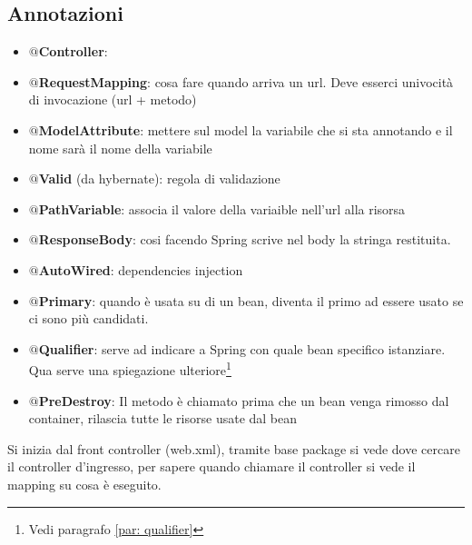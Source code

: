 \documentclass[11pt,a4paper]{book}
\begin{document}
\subsection{Annotazioni}
\begin{itemize}
	\item \textbf{$@$Controller}:
	\item \textbf{$@$RequestMapping}: cosa fare quando arriva un url. Deve esserci univocità di invocazione (url + metodo)
	\item \textbf{$@$ModelAttribute}: mettere sul model la variabile che si sta annotando e il nome sarà il nome della variabile
	\item \textbf{$@$Valid} (da hybernate): regola di validazione
	\item \textbf{$@$PathVariable}: associa il valore della variaible nell'url alla risorsa
	\item \textbf{$@$ResponseBody}: cosi facendo Spring scrive nel body la stringa restituita.
	\item \textbf{$@$AutoWired}: dependencies injection
	\item \textbf{$@$Primary}: quando è usata su di un bean, diventa il primo ad essere usato se ci sono più candidati.
	\item \textbf{$@$Qualifier}: serve ad indicare a Spring con quale bean specifico istanziare. Qua serve una spiegazione ulteriore\footnote{Vedi paragrafo \ref{par: qualifier}}
	\item \textbf{$@$PreDestroy}: Il metodo è chiamato prima che un bean venga rimosso dal container, rilascia tutte le risorse usate dal bean
\end{itemize}

Si inizia dal front controller (web.xml), tramite base package si vede dove cercare il controller d'ingresso, per sapere quando chiamare il controller si vede il mapping su cosa è eseguito.
\end{document}

